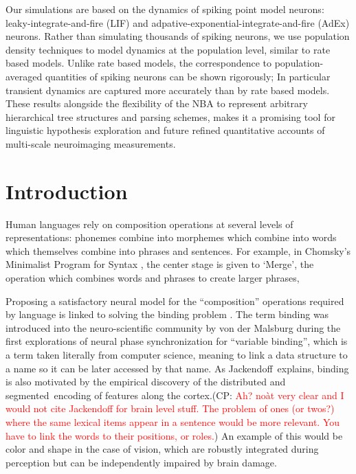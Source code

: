 \documentclass[10pt]{article}
\newcommand{\noteCP}[1]{(CP: \textcolor{red}{#1})}
\begin{document}
Our simulations are based on the dynamics of spiking point model neurons: leaky-integrate-and-fire (LIF) and adpative-exponential-integrate-and-fire (AdEx) neurons.
Rather than simulating thousands of spiking neurons, we use population density techniques to model dynamics at the population level, similar to rate based models.
Unlike rate based models, the correspondence to population-averaged quantities of spiking neurons can be shown rigorously; 
In particular transient dynamics are captured more accurately than by rate based models.
These results alongside the flexibility of the NBA to represent arbitrary hierarchical tree structures and parsing schemes, makes it a promising tool for linguistic hypothesis exploration and future refined quantitative accounts of multi-scale neuroimaging measurements.


\section{Introduction}

{\label{931947}}

Human languages rely on composition operations at several levels of representations: phonemes combine into morphemes which combine into words which themselves combine into phrases and sentences.
For example, in Chomsky's Minimalist Program for Syntax \cite{Chomsky_2013}, the center stage is given to `Merge', the operation which combines words and phrases to create larger phrases, 

Proposing a satisfactory neural model for the ``composition'' operations required by language is linked to solving the binding problem \cite{marcus14}.
The term binding was introduced into the neuro-scientific community by von der Malsburg\cite{von_der_Malsburg_1994} during the first explorations of neural phase synchronization for ``variable binding'', which is a term taken literally from computer science, meaning to link a data structure to a name so it can be later accessed by that name.
As Jackendoff\cite{Jackendoff_2002b}~explains, binding is also motivated by the empirical discovery of the distributed and segmented~encoding of features along the cortex.\noteCP{Ah? noàt very clear and I would not cite Jackendoff for brain level stuff. The problem of ones (or twos?) where the same lexical items appear in a sentence would be more relevant. You have to link the words to their positions, or roles.}
An example of this would be color and shape in the case of vision, which are robustly integrated during perception but can be independently impaired by brain damage.
\end{document}
